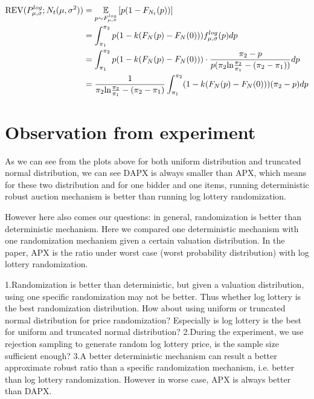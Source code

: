\begin{equation}\notag
\begin{split}	
	\text{REV}(P^{log}_{\mu,\sigma} ;N_t(\mu, \sigma^2)) &=\underset{p \sim F^{log}_{\mu,\sigma} }{\mathbb{E}}\left[ p(1-F_{N_t}(p))\right] \\ &= \int_{\pi_1}^{\pi_2} p(1 -  k(F_{N}(p)-F_{N}(0)))f^{log}_{\mu,\sigma}(p)dp \\&=\int_{\pi_1}^{\pi_2} p(1 -  k(F_{N}(p)-F_{N}(0)))\cdot \frac{\pi_2 -p}{p(\pi_2 \text{ln}\frac{\pi_2}{\pi_1} - (\pi_2-\pi_1))} dp \\&=  \frac{1}{\pi_2 \text{ln}\frac{\pi_2}{\pi_1} - (\pi_2-\pi_1)}\int_{\pi_1}^{\pi_2} (1 -  k(F_{N}(p)-F_{N}(0)))(\pi_2-p)dp 
\end{split}
\end{equation} 


\section{Observation from experiment}

As we can see from the plots above for both uniform distribution and truncated normal distribution, we can see DAPX is always smaller than APX, which means for these two distribution and for one bidder and one items, running deterministic robust auction mechanism is better than running log lottery randomization.

However here also comes our questions: in general, randomization is better than deterministic mechanism. Here we compared one deterministic mechanism with one randomization mechanism given a certain valuation distribution. In the paper, APX is the ratio under worst case (worst probability distribution) with log lottery randomization. 

1.Randomization is better than deterministic, but given a valuation distribution, using one specific randomization may not be better. Thus whether log lottery is the best randomization distribution. How about using uniform or truncated normal distribution for price randomization? Especially is log lottery is the best for uniform and truncated normal distribution?
2.During the experiment, we use rejection sampling to generate random log lottery price, is the sample size sufficient enough?
3.A better deterministic mechanism can result a better approximate robust ratio than a specific randomization mechanism, i.e. better than log lottery randomization. However in worse case, APX is always better than DAPX. 






